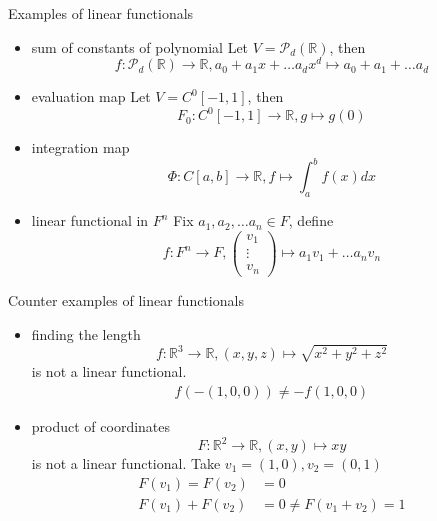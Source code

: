 \begin{example}
    Examples of linear functionals 
    \begin{itemize}
        \item sum of constants of polynomial
        Let $V = \mathcal{P}_d (\mathbb{R})$, then 
        \[
            f : \mathcal{P}_d ( \mathbb{R}) \to \mathbb{R}, a_0 + a_1 x + \hdots a_d  x^d \mapsto a_0 + a_1 + \hdots a_d
        \]
        \item evaluation map
        Let $V = C^0 [-1, 1]$, then 
        \[
            F_0: C^0 [-1, 1] \to \mathbb{R}, g \mapsto g(0)
        \]
        \item integration map
        \[
            \Phi: C[a, b] \to \mathbb{R}, f \mapsto \int_{a}^{b}   f(x) dx
        \]
        \item linear functional in $F^n$
        Fix $a_1, a_2, \hdots a_n \in F$, define 
        \[
            f : F^n \to F, \begin{pmatrix} v_1 \\ \vdots \\ v_n \end{pmatrix}  \mapsto a_1v_1 + \hdots a_n v_n
        \]
    \end{itemize} 

    Counter examples of linear functionals 
    \begin{itemize}
        \item finding the length 
        \[
        f: \mathbb{R}^3 \to \mathbb{R}, (x, y, z) \mapsto \sqrt{x^2 + y^2 + z^2}
        \]
        is not a linear functional.
        \begin{align*}
            f(-(1, 0, 0)) \neq - f(1, 0, 0)
        \end{align*}
        \item product of coordinates
        \[
            F: \mathbb{R}^2 \to \mathbb{R}, (x, y) \mapsto xy
        \]
        is not a linear functional.
        Take $v_1 = (1, 0), v_2 = (0, 1)$
        \begin{align*}
            F(v_1) = F(v_2) &= 0  \\
            F(v_1) + F(v_2) &= 0 \neq F(v_1 + v_2)= 1
        \end{align*}
    \end{itemize} 
\end{example}

